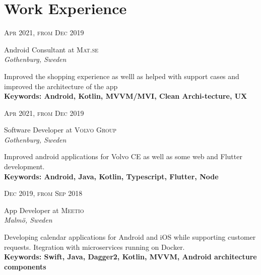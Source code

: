 \documentclass[10pt]{article} %
\begin{document}
{\begin{minipage}[t]{0.5\textwidth}
\section{Work Experience}

{\raggedleft\textsc{Apr 2021, from Dec 2019}\par}

{\raggedright\large Android Consultant at \textsc{Mat.se}\\
\textit{Gothenburg, Sweden}\\[5pt]}
\normalsize{Improved the shopping experience as welll as helped with support cases and improved the architecture of the app}\\
\textbf{Keywords: Android, Kotlin, MVVM/MVI, Clean Archi-tecture, UX}\\


{\raggedleft\textsc{Apr 2021, from Dec 2019}\par}

{\raggedright\large Software Developer at \textsc{Volvo Group}\\
\textit{Gothenburg, Sweden}\\[5pt]}
\normalsize{Improved android applications for Volvo CE as well as some web and Flutter development.}\\
\textbf{Keywords: Android, Java, Kotlin, Typescript, Flutter, Node}\\


{\raggedleft\textsc{Dec 2019, from Sep 2018}\par}

{\raggedright\large App Developer at \textsc{Meetio}\\
\textit{Malmö, Sweden}\\[5pt]}
\normalsize{Developing calendar applications for Android and iOS while supporting customer requests. Itegration with microservices running on Docker.}\\ 
\textbf{Keywords: Swift, Java, Dagger2, Kotlin, MVVM, Android architecture components }\\



\end{minipage}}
\end{document}
